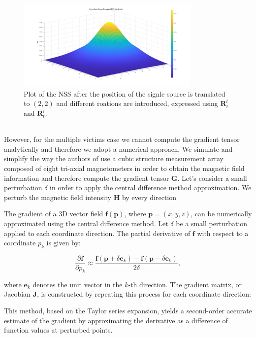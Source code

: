 \begin{figure}
    \centering
    \includegraphics[width=0.8\textwidth]{images/NSS_rotated_single_anal.jpg}
    \caption{Plot of the NSS after the position of the signle source is translated to $(2,2)$ and 
    different roations are introduced, expressed using $\mathbf{R}^t_r$ and $\mathbf{R}_t^i$.}
    \label{fig:NSS_rotated_single_anal}
\end{figure}

\noindent
\\
However, for the multiple victims case we cannot compute the gradient tensor 
analytically and therefore we adopt a numerical approach.
We simulate and simplify the way the authors of \cite{NSS_single_localization} use 
a cubic structure measurement array composed of eight
tri-axial magnetometers in order to obtain the magnetic
field information and therefore compute the gradient tensor $\mathbf{G}$.
Let's consider a small perturbation $\delta$ in order to apply the central difference
method approximation.
We perturb the magnetic field intensity $\mathbf{H}$ by every direction 

The gradient of a 3D vector field \( \mathbf{f}(\mathbf{p}) \), where \( \mathbf{p} = (x, y, z) \), 
can be numerically approximated using the central difference method. Let \( \delta \) be a small 
perturbation applied to each coordinate direction. The partial derivative of \( \mathbf{f} \) with 
respect to a coordinate \( p_k \) is given by:

\[
\frac{\partial \mathbf{f}}{\partial p_k} \approx \frac{\mathbf{f}(\mathbf{p} + \delta \mathbf{e}_k) 
- \mathbf{f}(\mathbf{p} - \delta \mathbf{e}_k)}{2\delta},
\]

where \( \mathbf{e}_k \) denotes the unit vector in the \( k \)-th direction. The gradient matrix, 
or Jacobian \( \mathbf{J} \), is constructed by repeating this process for each coordinate direction:

This method, based on the Taylor series expansion, yields a second-order accurate estimate of 
the gradient by approximating the derivative as a difference of function values at perturbed points.

